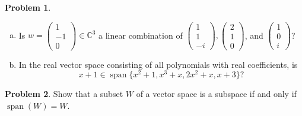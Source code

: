 \documentclass[11pt,oneside]{amsart}
\theoremstyle{definition}
\newtheorem{problem}{Problem}
\newcommand{\bC}{\mathbb{C}}
\DeclareMathOperator{\Span}{span}
\begin{document}
    \begin{problem}
        \hfill \begin{enumerate}[(a)]
            \item Is $w=\begin{pmatrix}1\\-1\\0\end{pmatrix}\in\bC^3$ a linear combination of $\begin{pmatrix}1\\1\\-i\end{pmatrix},\begin{pmatrix}2\\1\\0\end{pmatrix}$, and $\begin{pmatrix}1\\0\\i\end{pmatrix}$?
            \item In the real vector space consisting of all polynomials with real coefficients, is
            \[x+1\in\Span\{x^2+1,x^3+x,2x^2+x,x+3\}?\]
        \end{enumerate}
    \end{problem}

    \begin{problem}
        Show that a subset $W$ of a vector space is a subspace if and only if $\Span(W)=W$.
    \end{problem}
\end{document}
